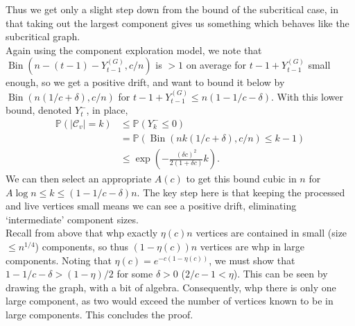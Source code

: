 \documentclass{tikzposter} %
\newcommand{\mc}{\mathcal}
\DeclareMathOperator{\Bin}{Bin}
\renewcommand\P[1]{\ensuremath{\mathbb{P}\left(#1\right)}}
\newtheorem{definition}{Definition}
\begin{document}
\begin{columns}
{    Thus we get only a slight step down from the bound of the subcritical case, in that taking out the largest component gives us something which behaves like the subcritical graph. \\

    Again using the component exploration model, we note that $\Bin(n - (t - 1) - Y^{(G)}_{t-1}, c/n)$ is $> 1$ on average for $t - 1 + Y^{(G)}_{t-1}$ small enough, so we get a positive drift, and want to bound it below by $\Bin(n(1/c + \delta), c/n)$ for $t - 1 + Y^{(G)}_{t - 1} \le n\left(1 - 1/c - \delta\right)$. With this lower bound, denoted $Y^-_t$, in place,
    \begin{align*}
      \P{|\mc{C}_v| = k} &\le \P{Y^-_k \le 0} \\
                         &= \P{\Bin(nk(1/c + \delta), c/n) \le k-1} \\
                         &\le \exp\left(-\frac{(\delta c)^2}{2 (1 + \delta c)} k\right).
    \end{align*}
    We can then select an appropriate $A(c)$ to get this bound cubic in $n$ for $A \log n \le k \le (1 - 1/c - \delta)n$. The key step here is that keeping the processed and live vertices small means we can see a positive drift, eliminating `intermediate' component sizes. \\

    Recall from above that whp exactly $\eta(c) n$ vertices are contained in small (size $\le n^{1/4}$) components, so thus $(1- \eta(c))n$ vertices are whp in large components. Noting that $\eta(c) = e^{-c(1-\eta(c))}$, we must show that $1 - 1/c - \delta > (1 - \eta) / 2$ for some $\delta > 0$ ($2/c - 1 < \eta$). This can be seen by drawing the graph, with a bit of algebra. Consequently, whp there is only one large component, as two would exceed the number of vertices known to be in large components. This concludes the proof. \\

    }
\end{columns}
\end{document}
